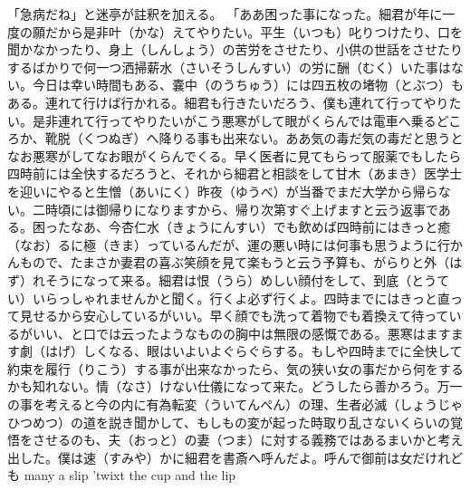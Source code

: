 \documentclass{book}
\begin{document}
「急病だね」と迷亭が註釈を加える。
「ああ困った事になった。細君が年に一度の願だから是非叶（かな）えてやりたい。平生（いつも）叱りつけたり、口を聞かなかったり、身上（しんしょう）の苦労をさせたり、小供の世話をさせたりするばかりで何一つ洒掃薪水（さいそうしんすい）の労に酬（むく）いた事はない。今日は幸い時間もある、嚢中（のうちゅう）には四五枚の堵物（とぶつ）もある。連れて行けば行かれる。細君も行きたいだろう、僕も連れて行ってやりたい。是非連れて行ってやりたいがこう悪寒がして眼がくらんでは電車へ乗るどころか、靴脱（くつぬぎ）へ降りる事も出来ない。ああ気の毒だ気の毒だと思うとなお悪寒がしてなお眼がくらんでくる。早く医者に見てもらって服薬でもしたら四時前には全快するだろうと、それから細君と相談をして甘木（あまき）医学士を迎いにやると生憎（あいにく）昨夜（ゆうべ）が当番でまだ大学から帰らない。二時頃には御帰りになりますから、帰り次第すぐ上げますと云う返事である。困ったなあ、今杏仁水（きょうにんすい）でも飲めば四時前にはきっと癒（なお）るに極（きま）っているんだが、運の悪い時には何事も思うように行かんもので、たまさか妻君の喜ぶ笑顔を見て楽もうと云う予算も、がらりと外（はず）れそうになって来る。細君は恨（うら）めしい顔付をして、到底（とうてい）いらっしゃれませんかと聞く。行くよ必ず行くよ。四時までにはきっと直って見せるから安心しているがいい。早く顔でも洗って着物でも着換えて待っているがいい、と口では云ったようなものの胸中は無限の感慨である。悪寒はますます劇（はげ）しくなる、眼はいよいよぐらぐらする。もしや四時までに全快して約束を履行（りこう）する事が出来なかったら、気の狭い女の事だから何をするかも知れない。情（なさ）けない仕儀になって来た。どうしたら善かろう。万一の事を考えると今の内に有為転変（ういてんぺん）の理、生者必滅（しょうじゃひつめつ）の道を説き聞かして、もしもの変が起った時取り乱さないくらいの覚悟をさせるのも、夫（おっと）の妻（つま）に対する義務ではあるまいかと考え出した。僕は速（すみや）かに細君を書斎へ呼んだよ。呼んで御前は女だけれども many a slip 'twixt the cup and the lip 
\end{document}
